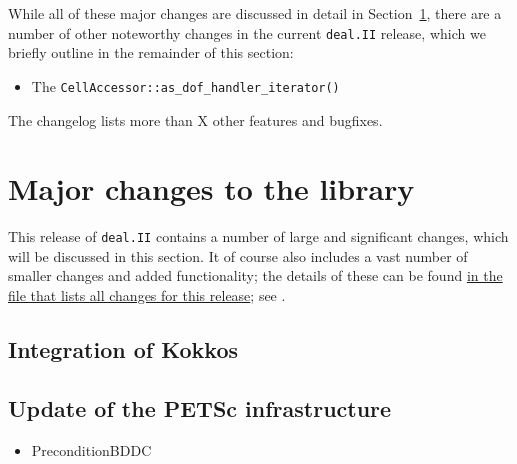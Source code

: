 \documentclass{ansarticle-preprint}
\newcommand{\specialword}[1]{\texttt{#1}}
\newcommand{\dealii}{{\specialword{deal.II}}\xspace}
\begin{document}
While all of these major changes are discussed in detail in
Section~\ref{sec:major}, there
are a number of other noteworthy changes in the current \dealii release,
which we briefly outline in the remainder of this section:
%
\begin{itemize}
  \item The \texttt{CellAccessor::as\_dof\_handler\_iterator()}
\end{itemize}
%
The changelog lists more than X other features and bugfixes.




\section{Major changes to the library}
\label{sec:major}

This release of \dealii contains a number of large and significant changes,
which will be discussed in this section.
It of course also includes a
vast number of smaller changes and added functionality; the details of these
can be found
\href{https://dealii.org/developer/doxygen/deal.II/changes_between_9_4_2_and_9_5_0.html}
{in the file that lists all changes for this release}; see \cite{changes95}.


\subsection{Integration of Kokkos}\label{sec:kokkos}



\subsection{Update of the PETSc infrastructure}\label{sec:petsc}

\begin{itemize}
\item PreconditionBDDC
\end{itemize}

\end{document}
